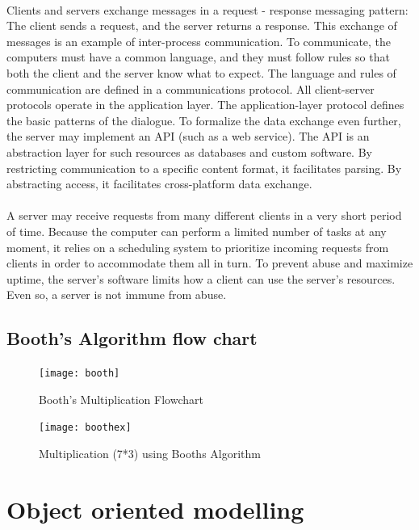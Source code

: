 \documentclass[10pt,a4paper]{article}
\begin{document}
	\paragraph{} Clients and servers exchange messages in a request - response messaging pattern: The client sends a request, and the server returns a response. This exchange of messages is an example of inter-process communication. To communicate, the computers must have a common language, and they must follow rules so that both the client and the server know what to expect. The language and rules of communication are defined in a communications protocol. All client-server protocols operate in the application layer. The application-layer protocol defines the basic patterns of the dialogue. To formalize the data exchange even further, the server may implement an API (such as a web service). The API is an abstraction layer for such resources as databases and custom software. By restricting communication to a specific content format, it facilitates parsing. By abstracting access, it facilitates cross-platform data exchange.
	\paragraph{} A server may receive requests from many different clients in a very short period of time. Because the computer can perform a limited number of tasks at any moment, it relies on a scheduling system to prioritize incoming requests from clients in order to accommodate them all in turn. To prevent abuse and maximize uptime, the server's software limits how a client can use the server's resources. Even so, a server is not immune from abuse. 



\subsection{Booth's Algorithm flow chart}
	\begin{figure}[h!]
		\centering
		\texttt{[image: booth]}
		\caption{Booth's Multiplication Flowchart}
	\end{figure}

	\begin{figure}[htb]
		\centering
		\texttt{[image: boothex]}
		\caption{ Multiplication (7*3) using Booths Algorithm}
	\end{figure}

\newpage
\section{Object oriented modelling}
\end{document}
